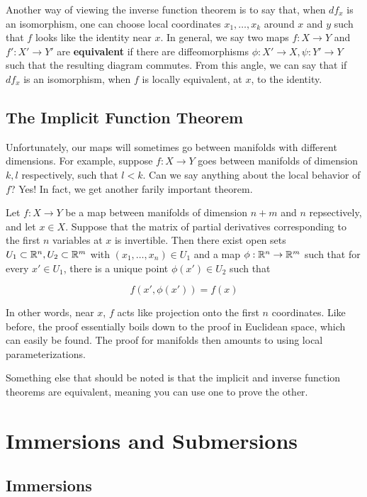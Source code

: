 Another way of viewing the inverse function theorem is to say that, when $df_x$ is an isomorphism, one can choose local coordinates $x_1, \ldots, x_k$ around $x$ and $y$ such that $f$ looks like the identity near $x$. In general, we say two maps $f: X \to Y$ and $f': X' \to Y'$ are \textbf{equivalent} if there are diffeomorphisms $\phi: X' \to X, \psi: Y' \to Y$ such that the resulting diagram commutes. From this angle, we can say that if $df_x$ is an isomorphism, when $f$ is locally equivalent, at $x$, to the identity. 

\subsection{The Implicit Function Theorem}

Unfortunately, our maps will sometimes go between manifolds with different dimensions. For example, suppose $f: X \to Y$ goes between manifolds of dimension $k,l$ respectively, such that $l < k$. Can we say anything about the local behavior of $f$? Yes! In fact, we get another farily important theorem.

\begin{theorem}
    Let $f: X \to Y$ be a map between manifolds of dimension $n + m$ and $n$ repsectively, and let $x \in X$. Suppose that the matrix of partial derivatives corresponding to the first $n$ variables at $x$ is invertible. Then there exist open sets $U_1 \subset \mathbb{R}^n, U_2 \subset \mathbb{R}^m$ with $(x_1, \ldots, x_n) \in U_1$ and a map $\phi: \mathbb{R}^n \to \mathbb{R}^m$ such that for every $x' \in U_1$, there is a unique point $\phi(x') \in U_2$ such that 

    \[f(x',\phi(x')) = f(x)\]
\end{theorem}

In other words, near $x$, $f$ acts like projection onto the first $n$ coordinates. Like before, the proof essentially boils down to the proof in Euclidean space, which can easily be found. The proof for manifolds then amounts to using local parameterizations.

Something else that should be noted is that the implicit and inverse function theorems are equivalent, meaning you can use one to prove the other. 

\section{Immersions and Submersions}

\subsection{Immersions}


